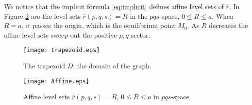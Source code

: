 \documentclass[a4paper,11pt]{article}
\theoremstyle{remark}
\begin{document}
We notice that the implicit formula \eqref{eq:implicit} defines affine level sets of $\hat{r}$. In Figure \ref{fig:affine} are the level sets $\hat{r}(p,q,s)=R$ in the $pqs$-space, $0\le R\le a$. When $R=a$, it passes the origin, which is the equilibrium point $M_0$. As $R$ decreases the affine level sets sweep out the positive $p,q$ sector. 
\begin{figure}
 \centering
  \texttt{[image: trapezoid.eps]}
  \caption{The trapezoid $D$, the domain of the graph.} \label{fig:D}
\end{figure}
\begin{figure}
 \centering
%
  \texttt{[image: Affine.eps]}
  \caption{Affine level sets $\hat{r}(p,q,s)=R$, $0\le R\le a$  in $pqs$-space} \label{fig:affine}
\end{figure}
\end{document}
